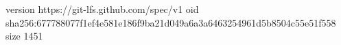 version https://git-lfs.github.com/spec/v1
oid sha256:677788077f1ef4e581e186f9ba21d049a6a3a6463254961d5b8504c55e51f558
size 1451
